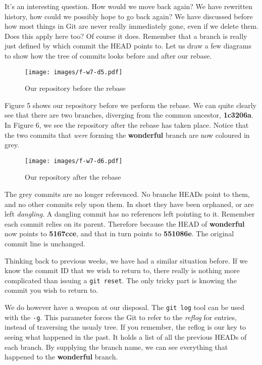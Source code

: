 It's an interesting question.  How would we move back again?  We have rewritten history, how could we possibly hope to go back again?  We have discussed before how most things in Git are never really immediately gone, even if we delete them.  Does this apply here too?  Of course it does.  Remember that a branch is really just defined by which commit the HEAD points to.  Let us draw a few diagrams to show how the tree of commits looks before and after our rebase.

\begin{figure}[hbt]
\centering
\texttt{[image: images/f-w7-d5.pdf]}
\caption{Our repository before the rebase}
\end{figure}

Figure 5 shows our repository before we perform the rebase.  We can quite clearly see that there are two branches, diverging from the common ancestor, \textbf{1c3206a}.  In Figure 6, we see the repository after the rebase has taken place.  Notice that the two commits that \emph{were} forming the \textbf{wonderful} branch are now coloured in grey.

\begin{figure}[hbt]
\centering
\texttt{[image: images/f-w7-d6.pdf]}
\caption{Our repository after the rebase}
\end{figure}

The grey commits are no longer referenced.  No branche HEADs point to them, and no other commits rely upon them.  In short they have been orphaned, or are left \emph{dangling}.  A dangling commit has no references left pointing to it.  Remember each commit relies on its parent.  Therefore because the HEAD of \textbf{wonderful} now points to \textbf{5167cce}, and that in turn points to \textbf{551086e}.  The original commit line is unchanged.

Thinking back to previous weeks, we have had a similar situation before.  If we know the commit ID that we wish to return to, there really is nothing more complicated than issuing a \texttt{git reset}.  The only tricky part is knowing the commit you wish to return to.

We do however have a weapon at our disposal.  The \texttt{git log} tool can be used with the \texttt{-g}.  This parameter forces the Git to refer to the \emph{reflog} for entries, instead of traversing the usualy tree.  If you remember, the reflog is our key to seeing what happened in the past.  It holds a list of all the previous HEADs of each branch.  By supplying the branch name, we can see everything that happened to the \textbf{wonderful} branch.

